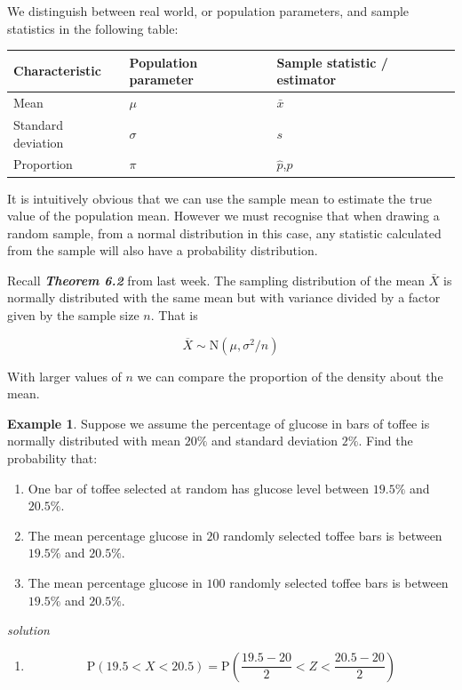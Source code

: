 \documentclass[
]{book}
\providecommand{\tightlist}{%
  \setlength{\itemsep}{0pt}\setlength{\parskip}{0pt}}
\theoremstyle{definition}
\theoremstyle{definition}
\newtheorem{example}{Example}[chapter]
\theoremstyle{definition}
\theoremstyle{definition}
\theoremstyle{remark}
\begin{document}
We distinguish between real world, or population parameters, and sample statistics in the following table:

\begin{longtable}[]{@{}lll@{}}
\toprule
Characteristic & Population parameter & Sample statistic / estimator\tabularnewline
\midrule
\endhead
Mean & \(\mu\) & \(\bar{x}\)\tabularnewline
Standard deviation & \(\sigma\) & \(s\)\tabularnewline
Proportion & \(\pi\) & \(\hat{p}\),\(p\)\tabularnewline
\bottomrule
\end{longtable}

It is intuitively obvious that we can use the sample mean to estimate the true value of the population mean. However we must recognise that when drawing a random sample, from a normal distribution in this case, any statistic calculated from the sample will also have a probability distribution.

Recall \textbf{\emph{Theorem 6.2}} from last week. The sampling distribution of the mean \(\bar{X}\) is normally distributed with the same mean but with variance divided by a factor given by the sample size \(n\). That is

\[\overline{X} \sim \text{N} (\mu, \sigma^2/{n})\]

With larger values of \(n\) we can compare the proportion of the density about the mean.

\begin{example}

Suppose we assume the percentage of glucose in bars of toffee is normally distributed with mean \(20\%\) and standard deviation \(2\%\). Find the probability that:

\begin{enumerate}
\def\labelenumi{\alph{enumi})}
\item
  One bar of toffee selected at random has glucose level between \(19.5\%\) and \(20.5\%\).
\item
  The mean percentage glucose in \(20\) randomly selected toffee bars is between \(19.5\%\) and \(20.5\%\).
\item
  The mean percentage glucose in \(100\) randomly selected toffee bars is between \(19.5\%\) and \(20.5\%\).
\end{enumerate}

\end{example}

\emph{solution}

\begin{enumerate}
\def\labelenumi{\alph{enumi})}
\tightlist
\item
  \[\text{P}(19.5<X<20.5)= \text{P}\left(\frac{19.5-20}{2}<Z<\frac{20.5-20}{2}\right)\]
\end{enumerate}
\end{document}
